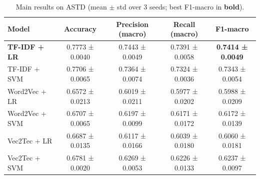 \begin{table}[ht]
\centering
\caption{Main results on ASTD (mean $\pm$ std over 3 seeds; best F1-macro in \textbf{bold}).}
\label{tab:main_results_astd}
\begin{tabular}{lcccc}
\toprule
Model & Accuracy & Precision (macro) & Recall (macro) & F1-macro \\
\midrule
\textbf{TF-IDF + LR} & 0.7773 ± 0.0040 & 0.7443 ± 0.0049 & 0.7391 ± 0.0058 & \textbf{0.7414 ± 0.0049} \\
TF-IDF + SVM & 0.7706 ± 0.0065 & 0.7364 ± 0.0074 & 0.7324 ± 0.0036 & 0.7343 ± 0.0054 \\
Word2Vec + LR & 0.6572 ± 0.0213 & 0.6019 ± 0.0211 & 0.5977 ± 0.0202 & 0.5988 ± 0.0209 \\
Word2Vec + SVM & 0.6707 ± 0.0065 & 0.6197 ± 0.0099 & 0.6171 ± 0.0172 & 0.6172 ± 0.0139 \\
Vec2Tec + LR & 0.6687 ± 0.0135 & 0.6117 ± 0.0166 & 0.6039 ± 0.0180 & 0.6060 ± 0.0181 \\
Vec2Tec + SVM & 0.6781 ± 0.0020 & 0.6269 ± 0.0053 & 0.6226 ± 0.0133 & 0.6237 ± 0.0097 \\
\bottomrule
\end{tabular}
\end{table}
